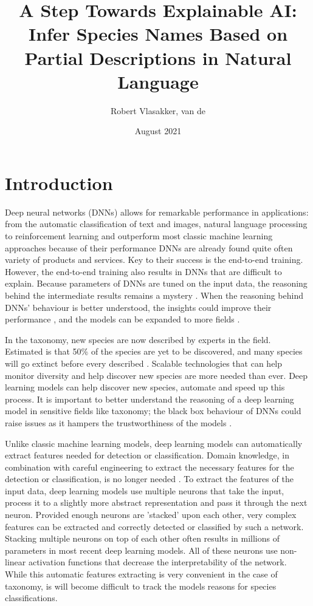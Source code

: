\documentclass{article}
\title{A Step Towards Explainable AI: Infer Species Names Based on Partial Descriptions in Natural Language}
\author{Robert Vlasakker, van de}
\date{August 2021}
\begin{document}
\graphicspath{ {./figures/} }

\maketitle

\section{Introduction}
Deep neural networks (DNNs) allows for remarkable performance in applications: from the automatic classification of text and images, natural language processing to reinforcement learning and outperform most classic machine learning approaches \autocite{he_delving_2015, brown_language_2020}
because of their performance DNNs are already found quite often variety of products and services.
Key to their success is the end-to-end training.
However, the end-to-end training also results in DNNs that are difficult to explain.
Because parameters of DNNs are tuned on the input data, the reasoning behind the intermediate results remains a mystery \autocite{li_interpretable_2021, losch_interpretability_2019}.
When the reasoning behind DNNs' behaviour is better understood, the insights could improve their performance \autocite{amershi_modeltracker_2015}, and the models can be expanded to more fields \autocite{lei_opening_2018}.

In the taxonomy, new species are now described by experts in the field.
Estimated is that 50\% of the species are yet to be discovered, and many species will go extinct before every described \autocite{lees_species_2015}.
Scalable technologies that can help monitor diversity and help discover new species are more needed than ever.
Deep learning models can help discover new species, automate and speed up this process.
It is important to better understand the reasoning of a deep learning model in sensitive fields like taxonomy; the black box behaviour of DNNs could raise issues as it hampers the trustworthiness of the models \autocite{carvalho_machine_2019}.

Unlike classic machine learning models, deep learning models can automatically extract features needed for detection or classification.
Domain knowledge, in combination with careful engineering to extract the necessary features for the detection or classification, is no longer needed \autocite{lecun_deep_2015}.
To extract the features of the input data, deep learning models use multiple neurons that take the input, process it to a slightly more abstract representation and pass it through the next neuron.
Provided enough neurons are 'stacked' upon each other, very complex features can be extracted and correctly detected or classified by such a network.
Stacking multiple neurons on top of each other often results in millions of parameters in most recent deep learning models.
All of these neurons use non-linear activation functions that decrease the interpretability of the network.
While this automatic features extracting is very convenient in the case of taxonomy, is will become difficult to track the models reasons for species classifications.
\end{document}
